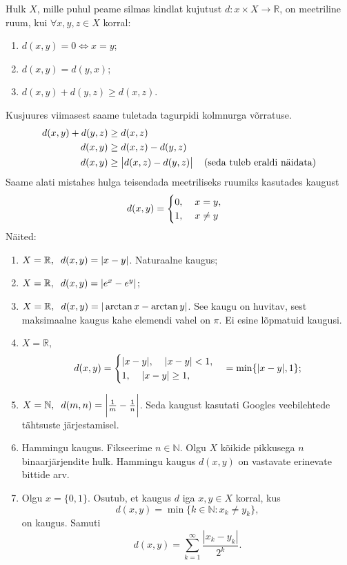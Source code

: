 \documentclass{article}[12pt]
\newcommand{\h}{\hspace{0.2cm}}
\newcommand{\R}{\mathbb{R}}
\newcommand{\N}{\mathbb{N}}
\theoremstyle{definition}
\theoremstyle{definition}
\begin{document}
Hulk $X$, mille puhul peame silmas kindlat kujutust $d:x\times X\rightarrow \R$, on meetriline ruum, kui $\forall x,y,z\in X$ korral:
\begin{enumerate}
	\item $d(x,y)=0 \Leftrightarrow x=y$;
	\item $d(x,y) = d(y,x)$;
	\item $d(x,y) + d(y,z) \geq d(x,z)$.
\end{enumerate}
Kusjuures viimasest saame tuletada tagurpidi kolmnurga võrratuse.
\begin{align*}
	d(x,y) + d(y,z) &\geq d(x,z) \\
	d(x,y) &\geq d(x,z) - d(y,z) \\
	d(x,y) &\geq \big\lvert d(x,z) - d(y,z) \big\rvert \h\h\text{(seda tuleb eraldi näidata)} \\
\end{align*} 
Saame alati mistahes hulga teisendada meetriliseks ruumiks kasutades kaugust
\[
	d(x,y) = \begin{cases}
		0,\h\h x=y, \\
		1,\h\h x\neq y
	\end{cases}
\]
Näited:
\begin{enumerate}
	\item $X=\R,\h d(x,y) = |x-y|$. Naturaalne kaugus;
	\item $X=\R,\h d(x,y) = |e^x-e^y|$;
	\item $X=\R,\h d(x,y) = |\arctan x - \arctan y|$. See kaugu on huvitav, sest maksimaalne kaugus kahe elemendi vahel on $\pi$. Ei esine lõpmatuid kaugusi.
	\item $X=\R,$
	\[
		d(x,y) = \begin{cases}
			|x-y|,\h\h |x-y| < 1, \\
			1,\h\h |x-y| \geq 1, \\
		\end{cases} = \min \{ |x-y|, 1 \};
	\]
	\item $X=\N,\h d(m,n) = \bigg\lvert \frac{1}{m} - \frac{1}{n} \bigg\rvert$. Seda kaugust kasutati Googles veebilehtede tähtsuste järjestamisel.
	\item Hammingu kaugus.
	Fikseerime $n\in \N$. 
	Olgu $X$ kõikide pikkusega $n$ binaarjärjendite hulk. 
	Hammingu kaugus $d(x,y)$ on vastavate erinevate bittide arv.
	\item Olgu $x=\{0,1\}$. Osutub, et kaugus $d$ iga $x,y\in X$ korral, kus
	\[
		d(x,y) = \min \{ k\in \N: x_k \neq y_k \},
	\]
	on kaugus. Samuti
	\[
		d(x,y) = \sum_{k=1}^\infty \frac{ |x_k-y_k| }{2^k}.
	\]
\end{enumerate}
\end{document}
